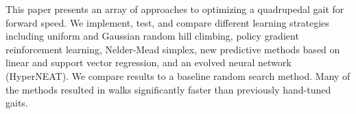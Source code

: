 
This paper presents an array of approaches to optimizing a quadrupedal
gait for forward speed.  We implement, test, and compare different
learning strategies including uniform and Gaussian random hill
climbing, policy gradient reinforcement learning\cite{kohl},
Nelder-Mead simplex\cite{nm}, new predictive methods based on linear
and support vector regression, and an evolved neural network
(HyperNEAT)\cite{clune}.  We compare results to a baseline random
search method.  Many of the methods resulted in walks significantly
faster than previously hand-tuned gaits.


